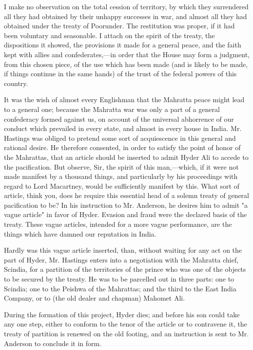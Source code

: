 I make no observation on the total cession of territory, by which they surrendered all they had obtained by their unhappy successes in war, and almost all they had obtained under the treaty of Poorunder. The restitution was proper, if it had been voluntary and seasonable. I attach on the spirit of the treaty, the dispositions it showed, the provisions it made for a general peace, and the faith kept with allies and confederates,—in order that the House may form a judgment, from this chosen piece, of the use which has been made (and is likely to be made, if things continue in the same hands) of the trust of the federal powers of this country.

It was the wish of almost every Englishman that the Mahratta peace might lead to a general one; because the Mahratta war was only a part of a general confederacy formed against us, on account of the universal abhorrence of our conduct which prevailed in every state, and almost in every house in India. Mr. Hastings was obliged to pretend some sort of acquiescence in this general and rational desire. He therefore consented, in order to satisfy the point of honor of the Mahrattas, that an article should be inserted to admit Hyder Ali to accede to the pacification. But observe, Sir, the spirit of this man,—which, if it were not made manifest by a thousand things, and particularly by his proceedings with regard to Lord Macartney, would be sufficiently manifest by this. What sort of article, think you, does he require this essential head of a solemn treaty of general pacification to be? In his instruction to Mr. Anderson, he desires him to admit "a vague article" in favor of Hyder. Evasion and fraud were the declared basis of the treaty. These vague articles, intended for a more vague performance, are the things which have damned our reputation in India.

Hardly was this vague article inserted, than, without waiting for any act on the part of Hyder, Mr. Hastings enters into a negotiation with the Mahratta chief, Scindia, for a partition of the territories of the prince who was one of the objects to be secured by the treaty. He was to be parcelled out in three parts: one to Scindia; one to the Peishwa of the Mahrattas; and the third to the East India Company, or to (the old dealer and chapman) Mahomet Ali.

During the formation of this project, Hyder dies; and before his son could take any one step, either to conform to the tenor of the article or to contravene it, the treaty of partition is renewed on the old footing, and an instruction is sent to Mr. Anderson to conclude it in form.

